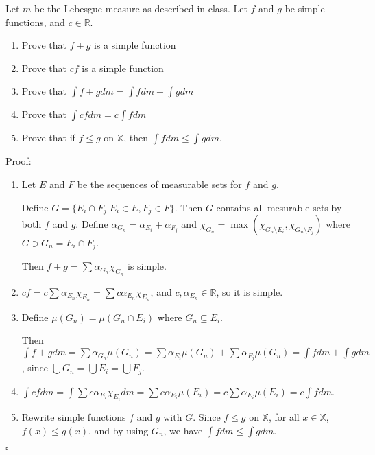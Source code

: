 \documentclass[12pt]{article}
\begin{document}
Let $m$ be the Lebesgue measure as described in class.  Let $f$ and $g$ be simple functions, and $c\in\mathbb{R}$.
\begin{enumerate}
    \item Prove that $f+g$ is a simple function
    \item Prove that $cf$ is a simple function
    \item Prove that $\int f+g dm=\int fdm+\int gdm$
    \item Prove that $\int cfdm=c\int fdm$
    \item Prove that if $f\leq g$ on $\mathbb{X}$, then $\int fdm\leq\int gdm$.
\end{enumerate}

Proof:
\begin{enumerate}
    \item Let $E$ and $F$ be the sequences of measurable sets for $f$ and $g$.

    Define $G = \{E_i \cap F_j | E_i \in E, F_j \in F\}$.
    Then $G$ contains all mesurable sets by both $f$ and $g$.
    Define $\alpha_{G_n} = \alpha_{E_i} + \alpha_{F_j}$
    and $\chi_{G_n} = \max(\chi_{G_n \setminus E_i}, \chi_{G_n \setminus F_j})$ where $G \ni G_n = E_i \cap F_j$.

    Then $f+g = \sum \alpha_{G_n} \chi_{G_n}$ is simple.

    \item $cf = c \sum \alpha_{E_n} \chi_{E_n} = \sum c\alpha_{E_n} \chi_{E_n}$, and $c, \alpha_{E_n} \in \mathbb{R}$, so it is simple.

    \item Define $\mu(G_n) = \mu(G_n \cap E_i)$ where $G_n \subseteq E_i$.

    Then $\int f+g dm = \sum \alpha_{G_n} \mu(G_n) = \sum \alpha_{E_i}\mu(G_n) + \sum \alpha_{F_j}\mu(G_n) =\int fdm+\int gdm$, since $\bigcup G_n = \bigcup E_i = \bigcup F_j$.

    \item $\int cfdm = \int \sum c \alpha_{E_i} \chi_{E_i}dm = \sum c\alpha_{E_i} \mu(E_i) = c \sum\alpha_{E_i} \mu(E_i) = c\int fdm$.

    \item Rewrite simple functions $f$ and $g$ with $G$. Since $f \le g$ on $\mathbb{X}$, for all $x \in \mathbb{X}$, $f(x) \le g(x)$, and by using $G_n$, we have $\int fdm\leq\int gdm$.
\end{enumerate}
$\square$
\end{document}
